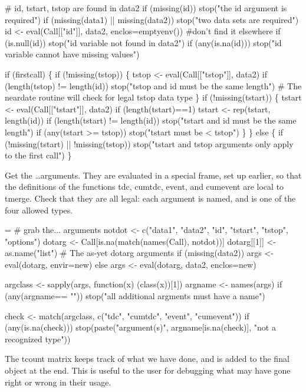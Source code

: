 \documentclass{article}
\begin{document}
\begin{nwchunk}
 # id, tstart, tstop are found in data2
 if (missing(id)) stop("the id argument is required")
 if (missing(data1) || missing(data2))
     stop("two data sets are required")
 id <- eval(Call[["id"]], data2, enclos=emptyenv()) #don't find it elsewhere
 if (is.null(id)) stop("id variable not found in data2")
 if (any(is.na(id))) stop("id variable cannot have missing values")
 
 if (firstcall) \{
     if (!missing(tstop)) \{
          tstop <-  eval(Call[["tstop"]],  data2)
          if (length(tstop) != length(id))
              stop("tstop and id must be the same length")
          # The neardate routine will check for legal tstop data type
       \}
     if (!missing(tstart)) \{
         tstart <- eval(Call[["tstart"]], data2)
         if (length(tstart)==1) tstart <- rep(tstart, length(id))
         if  (length(tstart) != length(id))        
             stop("tstart and id must be the same length")
         if (any(tstart >= tstop))
             stop("tstart must be < tstop")
          \}
 \}
 else \{
     if (!missing(tstart) || !missing(tstop))
         stop("tstart and tstop arguments only apply to the first call")
 \}
\end{nwchunk}

Get the \ldots arguments.  They are evaluated in a special frame,
set up earlier, so that the definitions of the functions tdc,
cumtdc, event, and cumevent are local to tmerge.
Check that they are all legal: each argument is named, and is one of the four
allowed types.
\begin{nwchunk}
=
 # grab the... arguments
 notdot <- c("data1", "data2", "id", "tstart", "tstop", "options")
 dotarg <- Call[is.na(match(names(Call), notdot))]
 dotarg[[1]] <- as.name("list")  # The as-yet dotarg arguments
 if (missing(data2)) args <- eval(dotarg, envir=new)
 else  args <- eval(dotarg, data2, enclos=new)
     
 argclass <- sapply(args, function(x) (class(x))[1])
 argname <- names(args)
 if (any(argname== "")) stop("all additional argments must have a name")
        
 check <- match(argclass, c("tdc", "cumtdc", "event", "cumevent"))
 if (any(is.na(check)))
     stop(paste("argument(s)", argname[is.na(check)], 
                    "not a recognized type"))
\end{nwchunk}

The tcount matrix keeps track of what we have done, and is added to
the final object at the end.  
This is useful to the user for debugging what may have gone right or
wrong in their usage.
\end{document}
